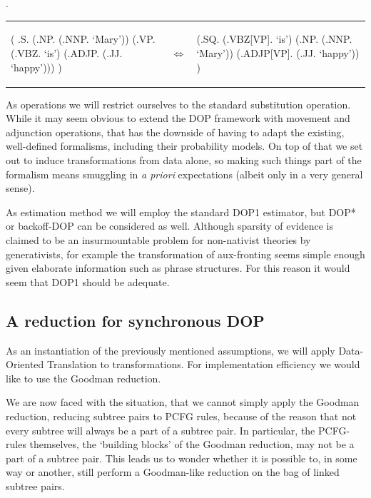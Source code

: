 \documentclass[a4paper]{article}
\theoremstyle{definition}
\begin{document}
\ex. \label{maryhappyann}

\begin{tabular}{lll}
\begin{parsetree}
( .S.
    (.NP. (.NNP. `Mary'))
    (.VP. (.VBZ. `is')
      (.ADJP. (.JJ. `happy')))
)
\end{parsetree}
& $\iff$ &
\begin{parsetree}
  (.SQ.
    (.VBZ[VP]. `is')
    (.NP. 
	(.NNP. `Mary'))
    (.ADJP[VP]. (.JJ. `happy'))
    )
\end{parsetree}
\end{tabular}
\vspace{1em}

As operations we will restrict ourselves to the standard substitution operation. While
it may seem obvious to extend the DOP framework with movement and adjunction operations,
that has the downside of having to adapt the existing, well-defined formalisms,
including their probability models. On top of that we set out to induce transformations
from data alone, so making such things part of the formalism means smuggling in
{\em a priori} expectations (albeit only in a very general sense).

As estimation method we will employ the standard DOP1 estimator, but DOP* or %
backoff-DOP can be considered as well. Although sparsity of evidence is
claimed to be an insurmountable problem for non-nativist theories by
generativists, for example the transformation of aux-fronting seems simple
enough given elaborate information such as phrase structures. For this reason
it would seem that DOP1 should be adequate.

\subsection{A reduction for synchronous DOP}

As an instantiation of the previously mentioned assumptions, we will apply
Data-Oriented Translation to transformations. For implementation efficiency
we would like to use the Goodman reduction.

We are now faced with the situation, that we cannot simply apply the Goodman
reduction, reducing subtree pairs to PCFG rules, because of the reason that not
every subtree will always be a part of a subtree pair. In particular, the
PCFG-rules themselves, the `building blocks' of the Goodman reduction, may not
be a part of a subtree pair. This leads us to wonder whether it is possible to,
in some way or another, still perform a Goodman-like reduction on the bag of
linked subtree pairs.
\end{document}
